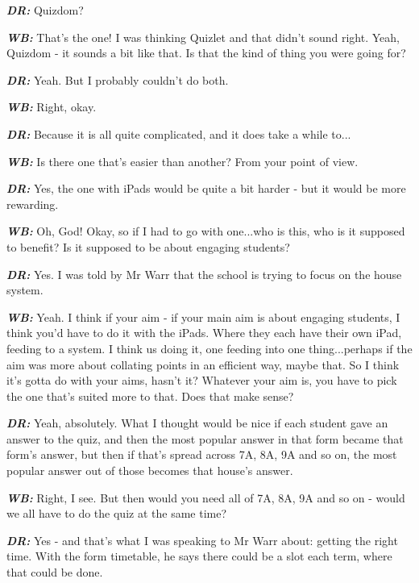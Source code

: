 \textit{\textbf{DR:}} Quizdom?

\textit{\textbf{WB:}} That's the one! I was thinking Quizlet and that didn't sound right. Yeah, Quizdom - it sounds a bit like that. Is that the kind of thing you were going for?

\textit{\textbf{DR:}} Yeah. But I probably couldn't do both.

\textit{\textbf{WB:}} Right, okay.

\textit{\textbf{DR:}} Because it is all quite complicated, and it does take a while to...

\textit{\textbf{WB:}} Is there one that's easier than another? From your point of view.

\textit{\textbf{DR:}} Yes, the one with iPads would be quite a bit harder - but it would be more rewarding.

\textit{\textbf{WB:}} Oh, God! Okay, so if I had to go with one...who is this, who is it supposed to benefit? Is it supposed to be about engaging students?

\textit{\textbf{DR:}} Yes. I was told by Mr Warr that the school is trying to focus on the house system.

\textit{\textbf{WB:}} Yeah. I think if your aim - if your main aim is about engaging students, I think you'd have to do it with the iPads. Where they each have their own iPad, feeding to a system. I think us doing it, one feeding into one thing...perhaps if the aim was more about collating points in an efficient way, maybe that. So I think it's gotta do with your aims, hasn't it? Whatever your aim is, you have to pick the one that's suited more to that. Does that make sense?

\textit{\textbf{DR:}} Yeah, absolutely. What I thought would be nice if each student gave an answer to the quiz, and then the most popular answer in that form became that form's answer, but then if that's spread across 7A, 8A, 9A and so on, the most popular answer out of those becomes that house's answer.

\textit{\textbf{WB:}} Right, I see. But then would you need all of 7A, 8A, 9A and so on - would we all have to do the quiz at the same time?

\textit{\textbf{DR:}} Yes - and that's what I was speaking to Mr Warr about: getting the right time. With the form timetable, he says there could be a slot each term, where that could be done.

